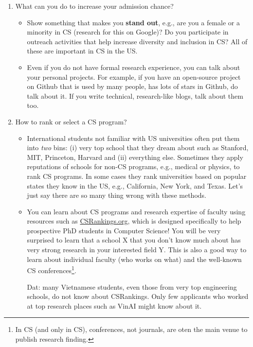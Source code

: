 \documentclass[11pt]{article}
\newenvironment{commentbox}{
 \small
    \begin{cbox}
 }{
   \end{cbox}
}
\begin{document}
\begin{enumerate}   
    \item What can you do to increase your admission chance?
      \begin{itemize}[leftmargin=*]
        \item Show something that makes you \textbf{stand out}, e.g., are you a female or a minority in CS (research for this on Google)? Do you participate in outreach activities that help increase diversity and inclusion in CS?  All of these are important in CS in the US.
    
    \item Even if you do not have formal research experience, you can talk about your personal projects. For example, if you have an open-source project on Github that is used by many people, has lots of stars in Github, do talk about it. If you write technical, research-like blogs, talk about them too.
    \end{itemize}

   \item How to rank or select a CS program?

\begin{itemize}[leftmargin=*]
\item International students not familiar with US universities often put them into \emph{two} bins:  (i) very top school that they dream about such as Stanford, MIT, Princeton, Harvard and (ii) everything else.  Sometimes they apply reputations of schools for non-CS programs, e.g., medical or physics, to rank CS programs. 
In some cases they rank universities based on popular states they know in the US, e.g., California, New York, and Texas.  Let's just say there are so many thing wrong with these methods.

\item You can learn about CS programs and research expertise of faculty using resources such as \href{https://csrankings.org}{CSRankings.org}, which is designed specifically to help prospective PhD students in Computer Science!  You will be very surprised to learn that a school X that you don't know much about has very strong research in your interested field Y. This is also a good way to learn about individual faculty (who works on what) and the well-known CS conferences\footnote{In CS (and only in CS), conferences, not journals, are oten the main venue to publish research finding.}.
\begin{commentbox}
    Dat: many Vietnamese students, even those from very top engineering schools, do not know about CSRankings.  Only few applicants who worked at top research places such as VinAI might know about it.
\end{commentbox}


\end{itemize}
\end{enumerate}
\end{document}
